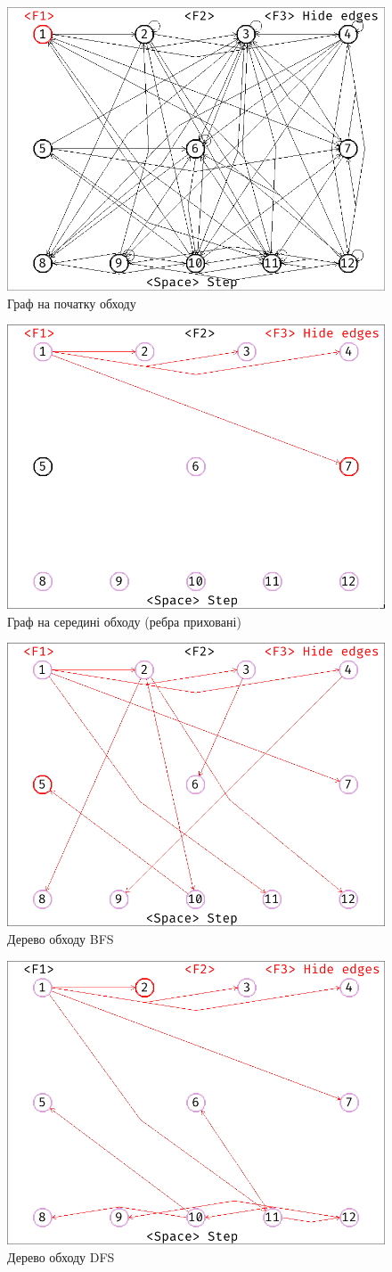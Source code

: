 \begin{figure}[ht!]
  \center\includegraphics[width=0.5\linewidth]{graph.png}
  \caption{Граф на початку обходу}
\end{figure}
\begin{figure}[ht!]
  \center\includegraphics[width=0.5\linewidth]{search.png}
  \caption{Граф на середині обходу (ребра приховані)}
\end{figure}
\begin{figure}[ht!]
  \center\includegraphics[width=0.5\linewidth]{tree_bfs.png}
  \caption{Дерево обходу BFS}
\end{figure}
\begin{figure}[ht!]
  \center\includegraphics[width=0.5\linewidth]{tree_dfs.png}
  \caption{Дерево обходу DFS}
\end{figure}
\pagebreak

